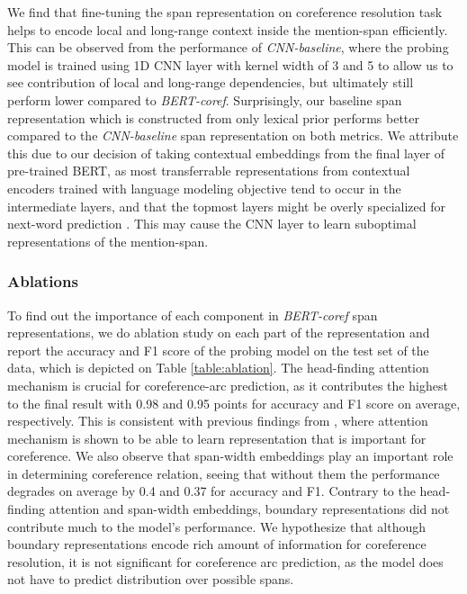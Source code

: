 \documentclass[11pt]{article}
\begin{document}
We find that fine-tuning the span representation on coreference resolution task helps to encode local and long-range context inside the mention-span efficiently. This can be observed from the performance of \textit{CNN-baseline}, where the probing model is trained using 1D CNN layer with kernel width of 3 and 5 to allow us to see contribution of local and long-range dependencies, but ultimately still perform lower compared to \textit{BERT-coref}. Surprisingly, our baseline span representation which is constructed from only lexical prior performs better compared to the \textit{CNN-baseline} span representation on both metrics. We attribute this due to our decision of taking contextual embeddings from the final layer of pre-trained BERT, as most transferrable representations from contextual encoders trained with language modeling objective tend to occur in the intermediate layers, and that the topmost layers might be overly specialized for next-word prediction \parencite{liu2019linguistic,peters2018elmo,peters-etal-2018-dissecting,blevins-etal-2018-deep,devlin2019bert}. This may cause the CNN layer to learn suboptimal representations of the mention-span.

\subsubsection{Ablations}
To find out the importance of each component in \textit{BERT-coref} span representations, we do ablation study on each part of the representation and report the accuracy and F1 score of the probing model on the test set of the data, which is depicted on Table \ref{table:ablation}. The head-finding attention mechanism is crucial for coreference-arc prediction, as it contributes the highest to the final result with 0.98 and 0.95 points for accuracy and F1 score on average, respectively. This is consistent with previous findings from \parencite{lee2017end}, where attention mechanism is shown to be able to learn representation that is important for coreference. We also observe that span-width embeddings play an important role in determining coreference relation, seeing that without them the performance degrades on average by 0.4 and 0.37 for accuracy and F1. Contrary to the head-finding attention and span-width embeddings, boundary representations did not contribute much to the model's performance. We hypothesize that although boundary representations encode rich amount of information for coreference resolution, it is not significant for coreference arc prediction, as the model does not have to predict distribution over possible spans.
\end{document}
